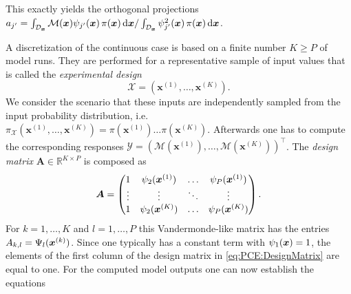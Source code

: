 This exactly yields the orthogonal projections \(a_{j^\prime} = \int_{\mathcal{D}_{\bm{x}}} \mathcal{M}(\bm{x}) \psi_{j^\prime}(\bm{x}) \, \pi(\bm{x}) \, \mathrm{d} \bm{x}
/ \int_{\mathcal{D}_{\bm{x}}} \psi_{j^\prime}^2(\bm{x}) \, \pi(\bm{x}) \, \mathrm{d} \bm{x}\).
\par %
A discretization of the continuous case is based on a finite number \(K \geq P\) of model runs.
They are performed for a representative sample of input values that is called the \emph{experimental design}
\begin{equation} \label{eq:PCE:ExperimentalDesign}
  \mathcal{X} = (\bm{x}^{(1)},\ldots,\bm{x}^{(K)}).
\end{equation}
We consider the scenario that these inputs are independently sampled from the input probability distribution,
i.e.\ \(\pi_{\mathcal{X}}(\bm{x}^{(1)},\ldots,\bm{x}^{(K)}) = \pi(\bm{x}^{(1)}) \ldots \pi(\bm{x}^{(K)})\).
Afterwards one has to compute the corresponding responses \(\mathcal{Y} = (\mathcal{M}(\bm{x}^{(1)}),\ldots,\mathcal{M}(\bm{x}^{(K)}))^\top\).
The \emph{design matrix} \(\bm{A} \in \mathds{R}^{K \times P}\) is composed as
\begin{equation} \label{eq:PCE:DesignMatrix}
  \bm{A} = \begin{pmatrix}
             1 & \psi_{2}(\bm{x}^{(1)}) & \ldots & \psi_{P}(\bm{x}^{(1)}) \\
             \vdots & \vdots & \ddots & \vdots \\
             1 & \psi_{2}(\bm{x}^{(K)}) & \ldots & \psi_{P}(\bm{x}^{(K)}) \\
          \end{pmatrix}.
\end{equation}
For \(k = 1,\ldots,K\) and \(l = 1,\ldots,P\) this Vandermonde-like matrix has the entries \(A_{k,l} = \Psi_l(\bm{x}^{(k)})\).
Since one typically has a constant term with \(\psi_{1}(\bm{x}) = 1\), the elements of the first column of the design matrix in \cref{eq:PCE:DesignMatrix} are equal to one.
For the computed model outputs one can now establish the equations
